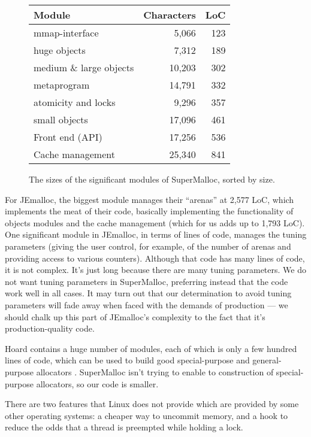 \documentclass[pldi]{sigplanconf-pldi15}
\begin{document}
\begin{figure}
\begin{center}
\begin{tabular}{lrr}
Module & Characters & LoC \\ \hline
mmap-interface         &   5,066 &  123 \\        
huge objects           &   7,312 &  189 \\
medium \& large objects&  10,203 &  302 \\
metaprogram            &  14,791 &  332 \\
atomicity and locks    &   9,296 &  357 \\
small objects          &  17,096 &  461 \\
Front end (API)        &  17,256 &  536 \\
Cache management       &  25,340 &  841 \\
\end{tabular}
\end{center}
\caption{The sizes of the significant modules of SuperMalloc, sorted by size.}
\label{fig:supermodules}
\end{figure}

For JEmalloc, the biggest module manages their ``arenas'' at 2,577
LoC, which implements the meat of their code, basically implementing
the functionality of objects modules and the cache management (which
for us adds up to 1,793 LoC).  
One significant module in JEmalloc, in
terms of lines of code, manages the tuning parameters (giving the user
control, for example, of the number of arenas and providing access to
various counters).  Although that code has many lines of code, it is
not complex.  It's just long because there are many tuning parameters.
We do not want tuning parameters in SuperMalloc, preferring instead
that the code work well in all cases.  It may turn out that our
determination to avoid tuning parameters will fade away when faced
with the demands of production --- we should chalk up this part of
JEmalloc's complexity to the fact that it's production-quality code.

Hoard contains a huge number of modules, each of which is only a few
hundred lines of code, which can be used to build good special-purpose
and general-purpose allocators \cite{AlexandrescuBe05}.  SuperMalloc
isn't trying to enable to construction of special-purpose allocators,
so our code is smaller.


There are two features that Linux does not provide which are provided
by some other operating systems: a cheaper way to uncommit memory, and
a hook to reduce the odds that a thread is preempted while holding a
lock.
\end{document}
